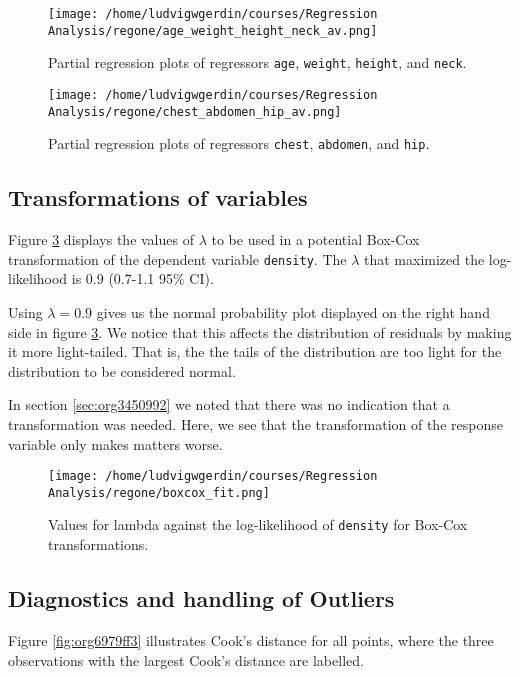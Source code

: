\documentclass[11pt]{article}
\begin{document}
\begin{figure}[htbp]
\centering
\texttt{[image: /home/ludvigwgerdin/courses/Regression Analysis/regone/age\_weight\_height\_neck\_av.png]}
\caption{\label{fig:org916f991}
Partial regression plots of regressors \texttt{age}, \texttt{weight}, \texttt{height}, and \texttt{neck}.}
\end{figure}

\begin{figure}[htbp]
\centering
\texttt{[image: /home/ludvigwgerdin/courses/Regression Analysis/regone/chest\_abdomen\_hip\_av.png]}
\caption{\label{fig:org3c4c5d5}
Partial regression plots of regressors \texttt{chest}, \texttt{abdomen}, and \texttt{hip}.}
\end{figure}
\subsection{Transformations of variables}
\label{sec:orgfb988d7}

Figure \ref{fig:orgea822ef} displays the values of \(\lambda\) to be used in a potential Box-Cox transformation of 
the dependent variable \texttt{density}. The \(\lambda\) that maximized the log-likelihood is 0.9 (0.7-1.1 95\% CI). 

Using \(\lambda = 0.9\) gives us the normal probability plot displayed on the right hand side in figure \ref{fig:orgea822ef}.
We notice that this affects the distribution of residuals by making it more light-tailed. That is, the 
the tails of the distribution are too light for the distribution to be considered normal.

In section \ref{sec:org3450992} we noted that there was no indication that a transformation was needed. 
Here, we see that the transformation of the response variable only makes matters worse.

\begin{figure}[h]
\centering
\texttt{[image: /home/ludvigwgerdin/courses/Regression Analysis/regone/boxcox\_fit.png]}
\caption{\label{fig:orgea822ef}
Values for lambda against the log-likelihood of \texttt{density} for Box-Cox transformations.}
\end{figure}

\subsection{Diagnostics and handling of Outliers}
\label{sec:org0398ef9}

Figure \ref{fig:org6979ff3} illustrates Cook's distance for all points, where the three observations with the largest 
Cook's distance are labelled. 
\end{document}
